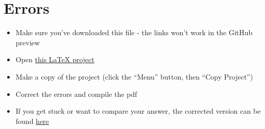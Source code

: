 \documentclass[11pt,a4paper]{article}
\begin{document}
\section{Errors}\label{sec:errors}
\begin{itemize}
\item Make sure you've downloaded this file - the links won't work in the GitHub preview
\item Open \href{https://www.overleaf.com/read/gnzphcnqgfvf}{this LaTeX project}
\item Make a copy of the project (click the ``Menu'' button, then ``Copy Project'')
\item Correct the errors and compile the pdf
\item If you get stuck or want to compare your answer, the corrected version can be found \href{https://www.overleaf.com/read/zsmyvxvdcvfr}{here}
\end{itemize}
\end{document}
